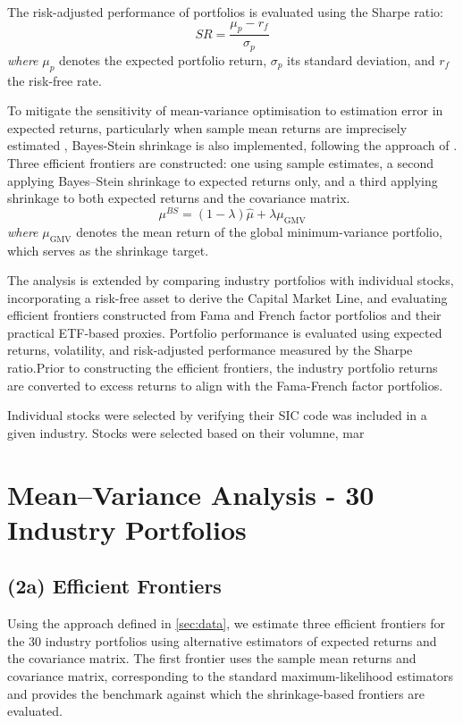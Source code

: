 \documentclass[11pt]{exam}
\begin{document}
\noindent The risk-adjusted performance of portfolios is evaluated using the Sharpe ratio:
\[
SR = \frac{\mu_p - r_f}{\sigma_p}
\]
\noindent\footnotesize\textit{where} $\mu_p$ denotes the expected portfolio return, 
$\sigma_p$ its standard deviation, and $r_f$ the risk-free rate.

\normalsize
\noindent \justifying To mitigate the sensitivity of mean-variance optimisation to estimation error in expected returns, particularly when sample mean returns are imprecisely estimated \parencite{Merton1980}, Bayes-Stein shrinkage is also implemented, following the approach of \parencite{jorion1986}. Three efficient frontiers are constructed: one using sample estimates, a second applying Bayes–Stein shrinkage to expected returns only, and a third applying shrinkage to both expected returns and the covariance matrix. \[ \mu^{BS} = (1-\lambda)\hat{\mu} + \lambda \mu_\text{GMV} \] 
\indent\footnotesize\textit{where} $\mu_\text{GMV}$ denotes the mean return of the global minimum-variance portfolio, which serves as the shrinkage \indent target.

\normalsize

\noindent \justifying The analysis is extended by comparing industry portfolios with individual stocks, incorporating a risk-free asset to derive the Capital Market Line, and evaluating efficient frontiers constructed from Fama and French factor portfolios \parencite{fama1993, fama2015} and their practical ETF-based proxies. Portfolio performance is evaluated using expected returns, volatility, and risk-adjusted performance measured by the Sharpe ratio.Prior to constructing the efficient frontiers, the industry portfolio returns are converted to excess returns to align with the Fama-French factor portfolios.

Individual stocks were selected by verifying their SIC code was included in a given industry. Stocks were selected based on their volumne, mar


\newpage

\section{Mean--Variance Analysis - 30 Industry Portfolios}
\label{sec:mv-frontier}
\subsection{(2a) Efficient Frontiers}

Using the approach defined in \autoref{sec:data}, we estimate three efficient frontiers for the 30 industry portfolios using alternative estimators of expected returns and the covariance matrix. The first frontier uses the sample mean returns and covariance matrix, corresponding to the standard maximum-likelihood estimators and provides the benchmark against which the shrinkage-based frontiers are evaluated.
\end{document}
